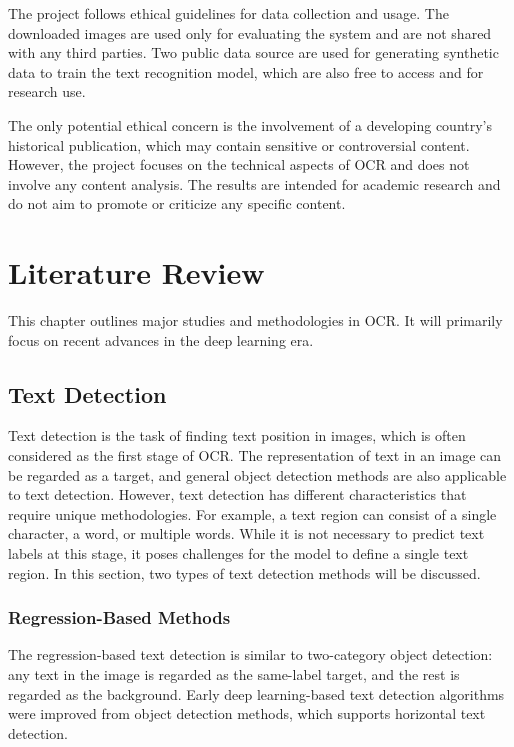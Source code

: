 \documentclass[12pt,twoside]{report}
\begin{document}
The project follows ethical guidelines for data collection and usage. The downloaded images are used only for evaluating the system and are not shared with any third parties. Two public data source \cite{charlist,wordlist} are used for generating synthetic data to train the text recognition model, which are also free to access and for research use.

The only potential ethical concern is the involvement of a developing country's historical publication, which may contain sensitive or controversial content. However, the project focuses on the technical aspects of OCR and does not involve any content analysis. The results are intended for academic research and do not aim to promote or criticize any specific content.

\chapter{Literature Review}
This chapter outlines major studies and methodologies in OCR. It will primarily focus on recent advances in the deep learning era.

\section{Text Detection}
Text detection is the task of finding text position in images, which is often considered as the first stage of OCR. The representation of text in an image can be regarded as a target, and general object detection methods are also applicable to text detection. However, text detection has different characteristics that require unique methodologies. For example, a text region can consist of a single character, a word, or multiple words. While it is not necessary to predict text labels at this stage, it poses challenges for the model to define a single text region. In this section, two types of text detection methods will be discussed.

\subsection{Regression-Based Methods}
The regression-based text detection is similar to two-category object detection: any text in the image is regarded as the same-label target, and the rest is regarded as the background. Early deep learning-based text detection algorithms were improved from object detection methods, which supports horizontal text detection.
\end{document}
